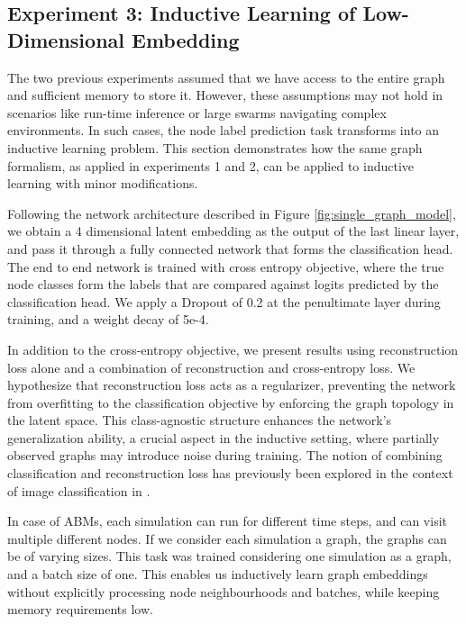 
\subsection{Experiment 3: Inductive Learning of Low-Dimensional Embedding}

The two previous experiments assumed that we have access to the entire graph and sufficient memory to store it. 
However, these assumptions may not hold in scenarios like run-time inference or large swarms navigating complex environments. 
In such cases, the node label prediction task transforms into an inductive learning problem. 
This section demonstrates how the same graph formalism, as applied in experiments 1 and 2, can be applied to inductive learning with minor modifications.

Following the network architecture described in Figure \ref{fig:single_graph_model}, 
we obtain a 4 dimensional latent embedding as the output of the last linear layer, 
and pass it through a fully connected network that forms the classification head. 
The end to end network is trained with cross entropy objective, 
where the true node classes form the labels that are compared against logits predicted by the classification head.
We apply a Dropout of 0.2 at the penultimate layer during training, and a weight decay of 5e-4. 

In addition to the cross-entropy objective, we present results using reconstruction loss alone and 
a combination of reconstruction and cross-entropy loss. 
 We hypothesize that reconstruction loss acts as a regularizer, 
preventing the network from overfitting to the classification objective by enforcing the graph topology in the latent space. 
This class-agnostic structure enhances the network's generalization ability, a crucial aspect in the inductive setting, 
where partially observed graphs may introduce noise during training. The notion of combining classification and reconstruction loss 
has previously been explored in the context of image classification in \cite{robert2018hybridnet}. 


In case of ABMs, each simulation can run for different time steps, and can visit multiple different nodes. If we consider each simulation a graph, the graphs can be of varying sizes. This task was trained considering one simulation as a graph, and a batch size of one. This enables us inductively learn graph embeddings without explicitly processing node neighbourhoods and batches, while keeping memory requirements low.


